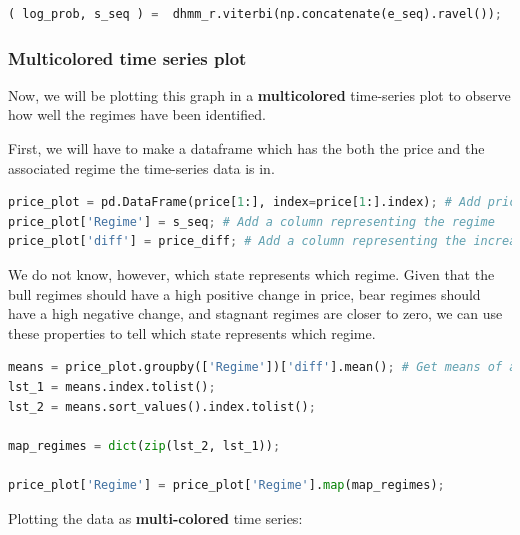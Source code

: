 \begin{lstlisting}[language=Python]
( log_prob, s_seq ) =  dhmm_r.viterbi(np.concatenate(e_seq).ravel());
\end{lstlisting}

\hypertarget{multicolored-time-series-plot}{%
\subsubsection{Multicolored time series
plot}\label{multicolored-time-series-plot}}

Now, we will be plotting this graph in a \textbf{multicolored}
time-series plot to observe how well the regimes have been identified.

First, we will have to make a dataframe which has the both the price and
the associated regime the time-series data is in.

\begin{lstlisting}[language=Python]
price_plot = pd.DataFrame(price[1:], index=price[1:].index); # Add price
price_plot['Regime'] = s_seq; # Add a column representing the regime 
price_plot['diff'] = price_diff; # Add a column representing the increase or decrease in price
\end{lstlisting}

We do not know, however, which state represents which regime. Given that
the bull regimes should have a high positive change in price, bear
regimes should have a high negative change, and stagnant regimes are
closer to zero, we can use these properties to tell which state
represents which regime.

\begin{lstlisting}[language=Python]
means = price_plot.groupby(['Regime'])['diff'].mean(); # Get means of all assigned states
lst_1 = means.index.tolist();
lst_2 = means.sort_values().index.tolist();

map_regimes = dict(zip(lst_2, lst_1));

price_plot['Regime'] = price_plot['Regime'].map(map_regimes);
\end{lstlisting}

Plotting the data as \textbf{multi-colored} time series:


